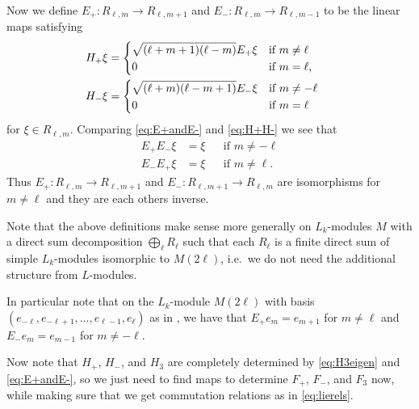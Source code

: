 Now we define $E_+ \colon R_{\ell,m}\to R_{\ell,m+1}$ and $E_- \colon R_{\ell,m}\to R_{\ell,m-1}$ to be the linear maps satisfying 
\begin{align}
  \begin{split} \label{eq:E+andE-}
    H_+ \xi &=
    \begin{dcases*}
      \sqrt{(\ell+m+1)(\ell-m)}E_+\xi & if $m\neq \ell$ \\
      0 & if $m=\ell$,
    \end{dcases*} \\
    H_- \xi &=
    \begin{dcases*}
      \sqrt{(\ell+m)(\ell-m+1)}E_-\xi & if $m\neq -\ell$ \\
      0 & if $m=\ell$
    \end{dcases*}
  \end{split}
\end{align}
for $\xi\in R_{\ell,m}$. Comparing \cref{eq:E+andE-} and \cref{eq:H+H-} we see that
\begin{align*}
  E_+E_-\xi &= \xi && \mbox{if }m\neq-\ell \\
  E_-E_+\xi &= \xi && \mbox{if }m\neq\ell.
\end{align*}
Thus $E_+\colon R_{\ell,m}\to R_{\ell,m+1}$ and $E_-\colon R_{\ell,m+1}\to R_{\ell,m}$ are isomorphisms for $m\neq\ell$ and they are each others inverse.
\begin{remark}\label{rem:Edef}
  Note that the above definitions make sense more generally on $L_k$-modules $M$ with a direct sum decomposition $\bigoplus_\ell R_\ell$ such that each $R_\ell$ is a finite direct sum of simple $L_k$-modules isomorphic to $M(2\ell)$, i.e.\ we do not need the additional structure from $L$-modules.

  In particular note that on the $L_k$-module $M(2\ell)$ with basis $(e_{-\ell},e_{-\ell+1},\dotsc,e_{\ell-1},e_\ell)$ as in , we have that $E_+ e_m = e_{m+1}$ for $m\neq\ell$ and $E_- e_m = e_{m-1}$ for $m\neq -\ell$.
\end{remark}

Now note that $H_+$, $H_-$, and $H_3$ are completely determined by \cref{eq:H3eigen} and \cref{eq:E+andE-}, so we just need to find maps to determine $F_+$, $F_-$, and $F_3$ now, while making sure that we get commutation relations as in \cref{eq:lierels}.

